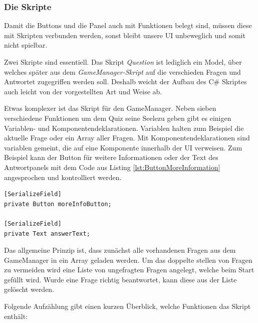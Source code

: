 \subsubsection{Die Skripte}
\label{QuizSkripte}
Damit die Buttons und die Panel auch mit Funktionen belegt sind, müssen diese mit Skripten verbunden werden, sonst bleibt unsere UI unbeweglich und somit nicht spielbar.

Zwei Skripte sind essentiell. Das Skript \textit{Question} ist lediglich ein Model, über welches später aus dem \textit{GameManager-Skript} auf die verschieden Fragen und Antwortet zugegriffen werden soll. Deshalb weicht der Aufbau des C\# Skriptes auch leicht von der vorgestellten Art und Weise ab. 

Etwas komplexer ist das Skript für den GameManager. Neben sieben verschiedene Funktionen um dem Quiz seine \glqq Seele\grqq zu geben gibt es einigen Variablen- und Komponentendeklarationen. Variablen halten zum Beispiel die aktuelle Frage oder ein Array aller Fragen. Mit Komponentendeklarationen sind variablen gemeint, die auf eine Komponente innerhalb der UI verweisen. Zum Beispiel kann der Button für weitere Informationen oder der Text des Antwortpanels mit dem Code aus Listing \ref{lst:ButtonMoreInformation} angesprochen und kontrolliert werden.

\lstset{style=sharpc}
\begin{lstlisting}[caption=Deklaration von UI Komponenten, label=lst:ButtonMoreInformation]
[SerializeField]
private Button moreInfoButton;

[SerializeField]
private Text answerText;
\end{lstlisting}

Das allgemeine Prinzip ist, dass zunächst alle vorhandenen Fragen aus dem GameManager in ein Array geladen werden. Um das doppelte stellen von Fragen zu vermeiden wird eine Liste von ungefragten Fragen angelegt, welche beim Start gefüllt wird. Wurde eine Frage richtig beantwortet, kann diese aus der Liste gelöscht werden.

Folgende Aufzählung gibt einen kurzen Überblick, welche Funktionen das Skript enthält:

